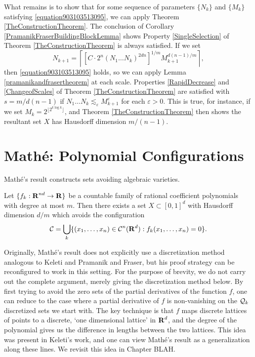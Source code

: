 What remains is to show that for some sequence of parameters $\{ N_k \}$ and $\{ M_k \}$ satisfying \eqref{equation903103513095}, we can apply Theorem \ref{TheConstructionTheorem}. The conclusion of Corollary \ref{PramanikFraserBuildingBlockLemma} shows Property \ref{SingleSelection} of Theorem \ref{TheConstructionTheorem} is always satisfied. If we set
%
\[ N_{k+1} = \left\lceil \left[ C \cdot 2^n (N_1 \dots N_k)^{2dn} \right]^{1/m} M_{k+1}^{d(n-1)/m} \right\rceil, \]
%
then \eqref{equation903103513095} holds, so we can apply Lemma \ref{pramanikandfrasertheorem} at each scale. Properties \ref{RapidDecrease} and \ref{ChangeofScales} of Theorem \ref{TheConstructionTheorem} are satisfied with $s = m/d(n-1)$ if $N_1 \dots N_k \lesssim_\varepsilon M_{k+1}^\varepsilon$ for each $\varepsilon > 0$. This is true, for instance, if we set $M_k = 2^{\lfloor 2^{k \log k} \rfloor}$, and Theorem \ref{TheConstructionTheorem} then shows the resultant set $X$ has Hausdorff dimension $m/(n-1)$.

\section{Math\'{e}: Polynomial Configurations}

Math\'{e}'s result constructs sets avoiding algebraic varieties.

\begin{theorem}[Math\'{e}]
    Let $\{ f_k: \operatorname{\mathbf{R}}^{nd} \to \mathbf{R} \}$ be a countable family of rational coefficient polynomials with degree at most $m$. Then there exists a set $X \subset [0,1]^d$ with Hausdorff dimension $d/m$ which avoids the configuration
    \[ \operatorname{\mathcal{C}} = \bigcup_k \{ (x_1, \dots, x_n) \in \operatorname{\mathcal{C}}^n(\operatorname{\mathbf{R}}^d) : f_k(x_1, \dots, x_n) = 0 \}. \]
\end{theorem}

Originally, Math\'{e}'s result does not explicitly use a discretization method analogous to Keleti and Pramanik and Fraser, but his proof strategy can be reconfigured to work in this setting. For the purpose of brevity, we do not carry out the complete argument, merely giving the discretization method below. By first trying to avoid the zero sets of the partial derivatives of the function $f$, one can reduce to the case where a partial derivative of $f$ is non-vanishing on the $\operatorname{\mathcal{Q}}_k$ discretized sets we start with. The key technique is that $f$ maps discrete lattices of points to a discrete, `one dimensional lattice' in $\operatorname{\mathbf{R}}^d$, and the degree of the polynomial gives us the difference in lengths between the two lattices. This idea was present in Keleti's work, and one can view Math\'{e}'s result as a generalization along these lines. We revisit this idea in Chapter BLAH.

